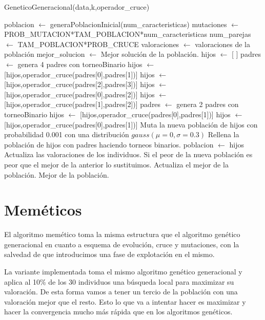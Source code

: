 \documentclass[12pt,a4paper]{article}
\begin{document}
	\begin{algorithm}
		\caption{GeneticoGeneracional(data,k,operador\_cruce)}
		\begin{algorithmic}
			\STATE poblacion $\leftarrow$ generaPoblacionInicial(num\_caracteristicas)
			\STATE mutaciones $\leftarrow$ PROB\_MUTACION*TAM\_POBLACION*num\_caracteristicas
			\STATE num\_parejas $\leftarrow$ TAM\_POBLACION*PROB\_CRUCE
			\STATE valoraciones $\leftarrow$ valoraciones de la población
			\STATE mejor\_solucion $\leftarrow$ Mejor solución de la población.
				\STATE hijos $\leftarrow$ [ ]
						\STATE padres $\leftarrow$ genera 4 padres con torneoBinario
						\STATE hijos $\leftarrow$ [hijos,operador\_cruce(padres[0],padres[1])]
						\STATE hijos $\leftarrow$ [hijos,operador\_cruce(padres[2],padres[3])]
						\STATE hijos $\leftarrow$ [hijos,operador\_cruce(padres[0],padres[2])]
						\STATE hijos $\leftarrow$ [hijos,operador\_cruce(padres[1],padres[2])]
					\ELSE
						\STATE padres $\leftarrow$ genera 2 padres con torneoBinario
						\STATE hijos $\leftarrow$ [hijos,operador\_cruce(padres[0],padres[1])]
						\STATE hijos $\leftarrow$ [hijos,operador\_cruce(padres[0],padres[1])]
					\ENDIF
				\ENDFOR
				\STATE Muta la nueva población de hijos con probabilidad 0.001 con una distribución $gauss(\mu=0,\sigma=0.3)$
				\STATE Rellena la población de hijos con padres haciendo torneos binarios.
				\STATE poblacion $\leftarrow$ hijos
				\STATE Actualiza las valoraciones de los individuos.
				\STATE Si el peor de la nueva población es peor que el mejor de la anterior lo sustituimos.
				\STATE Actualiza el mejor de la población.
			\ENDWHILE
			\RETURN Mejor de la población.
		\end{algorithmic}
	\end{algorithm}

	\newpage

	\section{Meméticos}
	\label{sec:memeticos}

	El algoritmo memético toma la misma estructura que el algoritmo genético generacional en cuanto a esquema de evolución, cruce y mutaciones, con la salvedad de que introducimos una fase de explotación en el mismo.

	La variante implementada toma el mismo algoritmo genético generacional y aplica al 10\% de los 30 individuos una búsqueda local para maximizar su valoración. De esta forma vamos a tener un tercio de la población con una valoración mejor que el resto. Esto lo que va a intentar hacer es maximizar y hacer la convergencia mucho más rápida que en los algoritmos genéticos.
\end{document}
